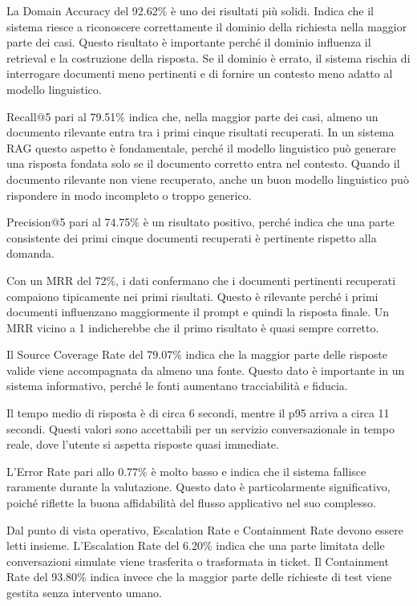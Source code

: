 La Domain Accuracy del 92.62\% è uno dei risultati più solidi. Indica che il sistema riesce a riconoscere correttamente il dominio della richiesta nella maggior parte dei casi. Questo risultato è importante perché il dominio influenza il retrieval e la costruzione della risposta. Se il dominio è errato, il sistema rischia di interrogare documenti meno pertinenti e di fornire un contesto meno adatto al modello linguistico.

Recall@5 pari al 79.51\% indica che, nella maggior parte dei casi, almeno un documento rilevante entra tra i primi cinque risultati recuperati. In un sistema RAG questo aspetto è fondamentale, perché il modello linguistico può generare una risposta fondata solo se il documento corretto entra nel contesto. Quando il documento rilevante non viene recuperato, anche un buon modello linguistico può rispondere in modo incompleto o troppo generico.

Precision@5 pari al 74.75\% è un risultato positivo, perché indica che una parte consistente dei primi cinque documenti recuperati è pertinente rispetto alla domanda.

Con un MRR del 72\%, i dati confermano che i documenti pertinenti recuperati compaiono tipicamente nei primi risultati. Questo è rilevante perché i primi documenti influenzano maggiormente il prompt e quindi la risposta finale. Un MRR vicino a 1 indicherebbe che il primo risultato è quasi sempre corretto.

Il Source Coverage Rate del 79.07\% indica che la maggior parte delle risposte valide viene accompagnata da almeno una fonte. Questo dato è importante in un sistema informativo, perché le fonti aumentano tracciabilità e fiducia.

Il tempo medio di risposta è di circa 6 secondi, mentre il p95 arriva a circa 11 secondi. Questi valori sono accettabili per un servizio conversazionale in tempo reale, dove l’utente si aspetta risposte quasi immediate.

L’Error Rate pari allo 0.77\% è molto basso e indica che il sistema fallisce raramente durante la valutazione. Questo dato è particolarmente significativo, poiché riflette la buona affidabilità del flusso applicativo nel suo complesso.

Dal punto di vista operativo, Escalation Rate e Containment Rate devono essere letti insieme. L’Escalation Rate del 6.20\% indica che una parte limitata delle conversazioni simulate viene trasferita o trasformata in ticket. Il Containment Rate del 93.80\% indica invece che la maggior parte delle richieste di test viene gestita senza intervento umano.

